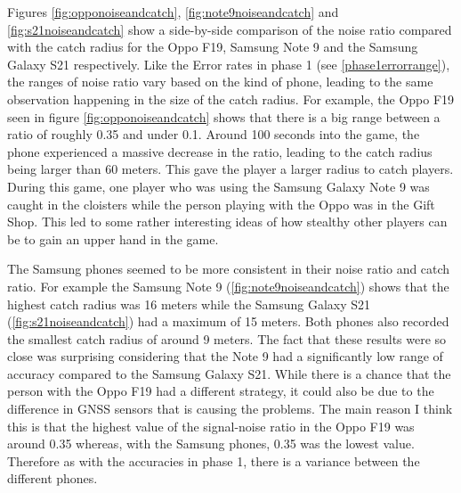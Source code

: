 \documentclass{l4proj}
\begin{document}
Figures \ref{fig:opponoiseandcatch}, \ref{fig:note9noiseandcatch} and \ref{fig:s21noiseandcatch} show a side-by-side comparison of the
noise ratio compared with the catch radius for the Oppo F19, Samsung Note 9 and the Samsung Galaxy S21 respectively. Like the Error rates in
phase 1 (see \ref{phase1errorrange}), the ranges of noise ratio vary based on the kind of phone, leading to the same observation happening in
the size of the catch radius. For example, the Oppo F19 seen in figure \ref{fig:opponoiseandcatch} shows that there is a big range between a ratio
of roughly 0.35 and under 0.1. Around 100 seconds into the game, the phone experienced a massive decrease in the ratio, leading to the catch radius
being larger than 60 meters. This gave the player a larger radius to catch players. During this game, one player who was using the Samsung
Galaxy Note 9 was caught in the cloisters while the person playing with the Oppo was in the Gift Shop. This led to some rather interesting ideas
of how stealthy other players can be to gain an upper hand in the game.

The Samsung phones seemed to be more consistent in their noise ratio and catch ratio. For example the Samsung Note 9 (\ref{fig:note9noiseandcatch})
shows that the highest catch radius was 16 meters while the Samsung Galaxy S21 (\ref{fig:s21noiseandcatch}) had a maximum of 15 meters. Both phones
also recorded the smallest catch radius of around 9 meters. The fact that these results were so close was surprising considering that the Note 9
had a significantly low range of accuracy compared to the Samsung Galaxy S21. While there is a chance that the person with the Oppo F19 had a different
strategy, it could also be due to the difference in GNSS sensors that is causing the problems. The main reason I think this is that the highest
value of the signal-noise ratio in the Oppo F19 was around 0.35 whereas, with the Samsung phones, 0.35 was the lowest value. Therefore as with the accuracies
in phase 1, there is a variance between the different phones.
\end{document}

